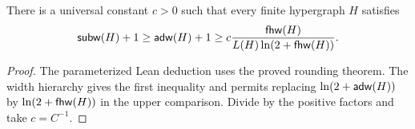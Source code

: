 \begin{corollary}
\label{cor:quantitative-reverse}
\leanok
There is a universal constant $c>0$ such that every finite hypergraph $H$
satisfies
\[
 \mathsf{subw}(H)+1\ge\mathsf{adw}(H)+1
 \ge c\frac{\mathsf{fhw}(H)}{L(H)\ln(2+\mathsf{fhw}(H))}.
\]
\end{corollary}
\begin{proof}
\leanok
The parameterized Lean deduction uses the proved rounding theorem.
The width hierarchy gives the first inequality and permits replacing
$\ln(2+\mathsf{adw}(H))$ by $\ln(2+\mathsf{fhw}(H))$ in the upper comparison. Divide
by the positive factors and take $c=C^{-1}$.
\end{proof}
